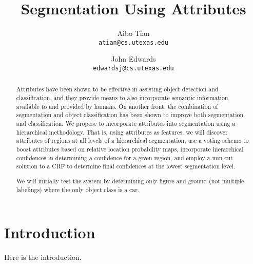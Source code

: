 \documentclass[10pt,twocolumn,letterpaper]{article}
\begin{document}
\title{Segmentation Using Attributes}

\author{Aibo Tian\\
{\tt\small atian@cs.utexas.edu}
\and
John Edwards\\
{\tt\small edwardsj@cs.utexas.edu}
}

\maketitle
\thispagestyle{empty}

\begin{abstract}
Attributes have been shown to be effective in assisting object detection and
classification, and they provide means to also incorporate semantic
information available to and provided by humans.  On another front, the
combination of segmentation and object classification has been shown to
improve both segmentation and classification.  We propose to incorporate
attributes into segmentation using a hierarchical methodology.
That is, using attributes as features, we will discover attributes of regions
at all levels of a hierarchical segmentation, use a voting scheme to
boost attributes based on relative location probability maps,
incorporate hierarchical confidences in determining a confidence for
a given region, and employ a min-cut solution to a CRF to determine
final confidences at the lowest segmentation level.

We will initially test the system by determining only
figure and ground (not multiple labelings) where the only object class
is a car.
\end{abstract}

\section{Introduction}
Here is the introduction.
\end{document}
